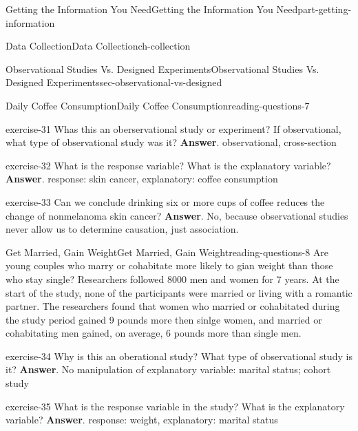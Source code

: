 \documentclass[oneside,10pt,]{book}
\numberwithin{equation}{section}
\begin{document}
\begin{partptx}{Getting the Information You Need}{}{Getting the Information You Need}{}{}{part-getting-information}
\begin{chapterptx}{Data Collection}{}{Data Collection}{}{}{ch-collection}
\begin{sectionptx}{Observational Studies Vs. Designed Experiments}{}{Observational Studies Vs. Designed Experiments}{}{}{sec-observational-vs-designed}
\begin{reading-questions-subsection-numberless}{Daily Coffee Consumption}{}{Daily Coffee Consumption}{}{}{reading-questions-7}
\begin{divisionexercise}{1}{}{}{exercise-31}%
Whas this an oberservational study or experiment? If observational, what type of observational study was it? \textbf{Answer}.\hypertarget{answer-31}{}\quad%
observational, cross-section\end{divisionexercise}%
\begin{divisionexercise}{2}{}{}{exercise-32}%
What is the response variable? What is the explanatory variable? \textbf{Answer}.\hypertarget{answer-32}{}\quad%
response: skin cancer, explanatory: coffee consumption\end{divisionexercise}%
\begin{divisionexercise}{3}{}{}{exercise-33}%
Can we conclude drinking six or more cups of coffee reduces the change of nonmelanoma skin cancer? \textbf{Answer}.\hypertarget{answer-33}{}\quad%
No, because observational studies never allow us to determine causation, just association.\end{divisionexercise}%
\end{reading-questions-subsection-numberless}
%
%
\typeout{************************************************}
\typeout{************************************************}
%
\begin{reading-questions-subsection-numberless}{Get Married, Gain Weight}{}{Get Married, Gain Weight}{}{}{reading-questions-8}
\hypertarget{p-8}{}%
Are young couples who marry or cohabitate more likely to gian weight than those who stay single? Researchers followed 8000 men and women for 7 years. At the start of the study, none of the participants were married or living with a romantic partner. The researchers found that women who married or cohabitated during the study period gained 9 pounds more then sinlge women, and married or cohabitating men gained, on average, 6 pounds more than single men.%
\begin{divisionexercise}{1}{}{}{exercise-34}%
Why is this an oberational study? What type of observational study is it? \textbf{Answer}.\hypertarget{answer-34}{}\quad%
No manipulation of explanatory variable: marital status; cohort study\end{divisionexercise}%
\begin{divisionexercise}{2}{}{}{exercise-35}%
What is the response variable in the study? What is the explanatory variable? \textbf{Answer}.\hypertarget{answer-35}{}\quad%
response: weight, explanatory: marital status\end{divisionexercise}%

\end{reading-questions-subsection-numberless}
\end{sectionptx}
\end{chapterptx}
\end{partptx}
\end{document}

